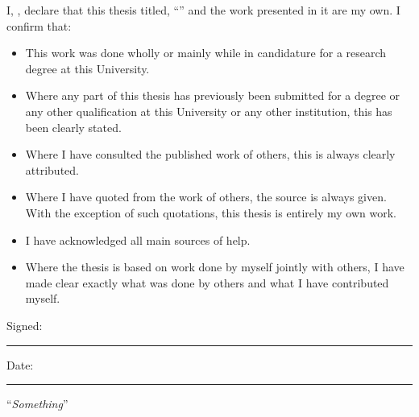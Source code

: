 \documentclass[
11pt, %
english, %
singlespacing, %
headsepline, %
]{MastersDoctoralThesis} %
\begin{document}

\begin{declaration}
\addchaptertocentry{\authorshipname} %
\noindent I, \authorname, declare that this thesis titled, \enquote{\ttitle} and the work presented in it are my own. I confirm that:

\begin{itemize} 
\item This work was done wholly or mainly while in candidature for a research degree at this University.
\item Where any part of this thesis has previously been submitted for a degree or any other qualification at this University or any other institution, this has been clearly stated.
\item Where I have consulted the published work of others, this is always clearly attributed.
\item Where I have quoted from the work of others, the source is always given. With the exception of such quotations, this thesis is entirely my own work.
\item I have acknowledged all main sources of help.
\item Where the thesis is based on work done by myself jointly with others, I have made clear exactly what was done by others and what I have contributed myself.\\
\end{itemize}
 
\noindent Signed:\\
\rule[0.5em]{25em}{0.5pt} %
 
\noindent Date:\\
\rule[0.5em]{25em}{0.5pt} %
\end{declaration}

\cleardoublepage


\vspace*{0.2\textheight}

\noindent\enquote{\itshape Something}\bigbreak
\end{document}
